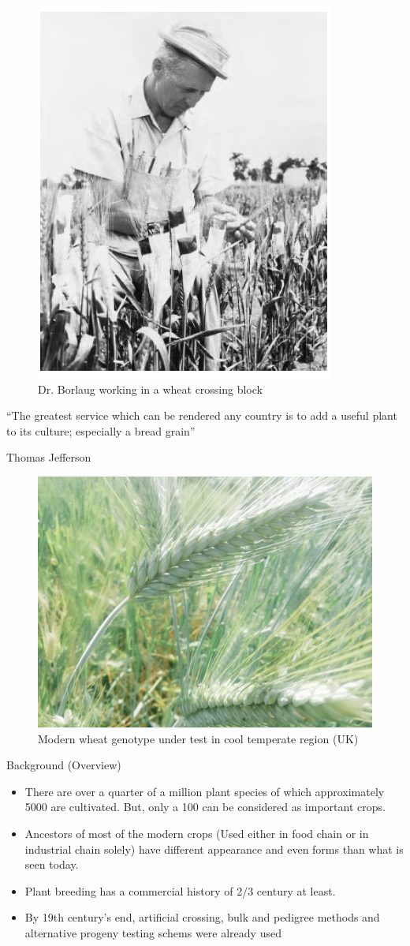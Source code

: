 \documentclass[11pt,ignorenonframetext,aspectratio=169]{beamer}
\providecommand{\tightlist}{%
  \setlength{\itemsep}{0pt}\setlength{\parskip}{0pt}}
\begin{document}
\begin{frame}{}
\protect\hypertarget{section-1}{}
\begin{figure}
\includegraphics[width=0.45\linewidth,height=0.75\textheight]{./images/borlaug_wheat_crossing_block} \caption{Dr. Borlaug working in a wheat crossing block}\label{fig:borlaug}
\end{figure}
\end{frame}

\begin{frame}{}
\protect\hypertarget{section-2}{}
``The greatest service which can be rendered any country is to add a
useful plant to its culture; especially a bread grain''

Thomas Jefferson

\begin{figure}
\includegraphics[width=0.45\linewidth,height=0.75\textheight]{./images/Triticum3} \caption{Modern wheat genotype under test in cool temperate region (UK)}\label{fig:modern-triticum-uk}
\end{figure}
\end{frame}

\begin{frame}{Background (Overview)}
\protect\hypertarget{background-overview}{}
\begin{itemize}
\tightlist
\item
  There are over a quarter of a million plant species of which
  approximately 5000 are cultivated. But, only a 100 can be considered
  as important crops.
\item
  Ancestors of most of the modern crops (Used either in food chain or in
  industrial chain solely) have different appearance and even forms than
  what is seen today.
\item
  Plant breeding has a commercial history of 2/3 century at least.
\item
  By 19th century's end, artificial crossing, bulk and pedigree methods
  and alternative progeny testing schems were already used
\end{itemize}
\end{frame}
\end{document}
